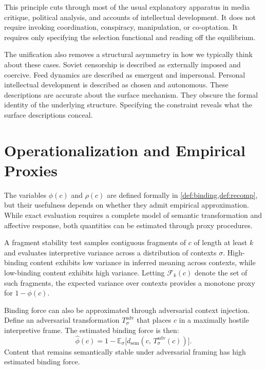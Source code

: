 \documentclass[12pt]{article}
\newcommand{\bind}{\phi}
\newcommand{\recomp}{\rho}
\newcommand{\dsem}{d_{\mathrm{sem}}}
\begin{document}
This principle cuts through most of the usual explanatory apparatus in
media critique, political analysis, and accounts of intellectual
development. It does not require invoking coordination, conspiracy,
manipulation, or co-optation. It requires only specifying the selection
functional and reading off the equilibrium.

The unification also removes a structural asymmetry in how we typically
think about these cases. Soviet censorship is described as externally
imposed and coercive. Feed dynamics are described as emergent and
impersonal. Personal intellectual development is described as chosen and
autonomous. These descriptions are accurate about the surface mechanism.
They obscure the formal identity of the underlying structure. Specifying
the constraint reveals what the surface descriptions conceal.

\section{Operationalization and Empirical Proxies}
\label{sec:measurement}

The variables $\bind(c)$ and $\recomp(c)$ are defined formally in
\cref{def:binding,def:recomp}, but their usefulness depends on whether
they admit empirical approximation. While exact evaluation requires a
complete model of semantic transformation and affective response, both
quantities can be estimated through proxy procedures.

A fragment stability test samples contiguous fragments of $c$ of length
at least $k$ and evaluates interpretive variance across a distribution
of contexts $\sigma$. High-binding content exhibits low variance in
inferred meaning across contexts, while low-binding content exhibits
high variance. Letting $\mathcal{F}_k(c)$ denote the set of such
fragments, the expected variance over contexts provides a monotone proxy
for $1 - \bind(c)$.

Binding force can also be approximated through adversarial context
injection. Define an adversarial transformation $T_\sigma^{\mathrm{adv}}$
that places $c$ in a maximally hostile interpretive frame. The estimated
binding force is then:
\[
\widehat{\bind}(c) = 1 - \mathbb{E}_\sigma\bigl[\dsem(c,\,
T_\sigma^{\mathrm{adv}}(c))\bigr].
\]
Content that remains semantically stable under adversarial framing has
high estimated binding force.
\end{document}
